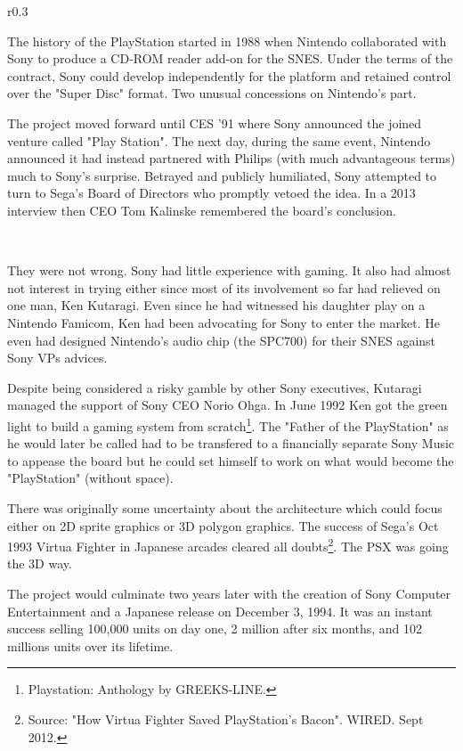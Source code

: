 \begin{wrapfigure}[11]{r}{0.3\textwidth}{
\centering {}}
\end{wrapfigure}
The history of the PlayStation started in 1988 when Nintendo collaborated with Sony to produce a CD-ROM reader add-on for the SNES. Under the terms of the contract, Sony could develop independently for the platform and retained control over the "Super Disc" format. Two unusual concessions on Nintendo's part.\\
\par
 The project moved forward until CES '91 where Sony announced the joined venture called "Play Station". The next day, during the same event, Nintendo announced it had instead partnered with Philips (with much advantageous terms) much to Sony's surprise. Betrayed and publicly humiliated, Sony attempted to turn to Sega's Board of Directors who promptly vetoed the idea. In a 2013 interview then CEO Tom Kalinske remembered the board's conclusion.\\
\par
{}\\
\par
They were not wrong. Sony had little experience with gaming. It also had almost not interest in trying either since most of its involvement so far had relieved on one man, Ken Kutaragi. Even since he had witnessed his daughter play on a Nintendo Famicom, Ken had been advocating for Sony to enter the market. He even had designed Nintendo's audio chip (the SPC700) for their SNES against Sony VPs advices.\\
\par
 Despite being considered a risky gamble by other Sony executives, Kutaragi managed the support of Sony CEO Norio Ohga. In June 1992 Ken got the green light to build a gaming system from scratch\footnote{Playstation: Anthology by GREEKS-LINE.}. The "Father of the PlayStation" as he would later be called had to be transfered to a financially separate Sony Music to appease the board but he could set himself to work on what would become the "PlayStation" (without space).\\
\par
There was originally some uncertainty about the architecture which could focus either on 2D sprite graphics or 3D polygon graphics. The success of Sega's Oct 1993 Virtua Fighter in Japanese arcades cleared all doubts\footnote{Source: "How Virtua Fighter Saved PlayStation's Bacon". WIRED. Sept 2012.}. The PSX was going the 3D way.\\
\par
The project would culminate two years later with the creation of Sony Computer Entertainment and a Japanese release on December 3, 1994. It was an instant success selling 100,000 units on day one, 2 million after six months, and  102 millions units over its lifetime.\\
\par
{}


